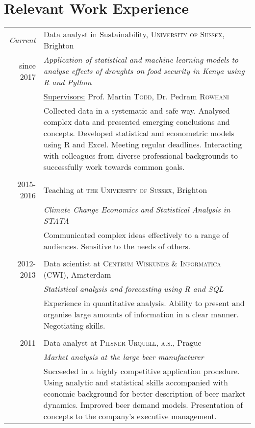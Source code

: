 \documentclass[a4paper,10pt]{article}
\begin{document}
\section{Relevant Work Experience}
\begin{tabular}{r|p{11cm}}
 \emph{Current} & Data analyst in Sustainability, \textsc{University of Sussex}, Brighton \\since \textsc{2017}&\emph{Application of statistical and machine learning models to analyse effects of droughts on food security in Kenya using R and Python}\\
& \underline{Supervisors:} Prof. Martin \textsc{Todd}, Dr. Pedram \textsc{Rowhani}\\
 &\footnotesize{Collected data in a systematic and safe way. Analysed complex data and presented emerging conclusions and concepts. Developed statistical and econometric models using R and Excel.  Meeting regular deadlines. Interacting with colleagues from diverse professional backgrounds to successfully work towards common goals.}
 
 
 \\\multicolumn{2}{c}{} \\
 \textsc{2015-2016} & Teaching at \textsc{the University of Sussex}, Brighton \\&\emph{Climate Change Economics and Statistical Analysis in STATA}\\&\footnotesize{Communicated complex ideas effectively to a range of audiences. Sensitive to the needs of others.}\\\multicolumn{2}{c}{} \\
 
 \textsc{2012-2013} & Data scientist at \textsc{Centrum Wiskunde \& Informatica (CWI)}, Amsterdam\\ &\emph{Statistical analysis and forecasting using R and SQL}\\&\footnotesize{Experience in quantitative analysis. Ability to present and organise large amounts of information in a clear manner. Negotiating skills.}\\\multicolumn{2}{c}{} \\

\textsc{2011} & Data analyst at \textsc{Pilsner Urquell, a.s.}, Prague\\ &\emph{Market analysis at the large beer manufacturer}\\&\footnotesize{Succeeded in a highly competitive application procedure. Using analytic and statistical skills accompanied with economic background for better description of beer market dynamics. Improved beer demand models. Presentation of concepts to the company's executive management.}
\end{tabular}
\end{document}
